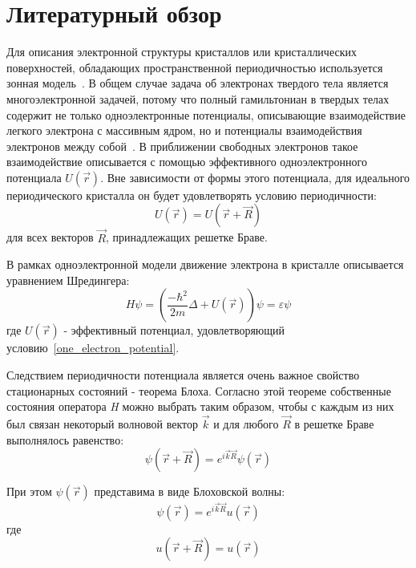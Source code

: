 \chapter{Литературный обзор} \label{chapt1}


Для описания электронной структуры кристаллов или кристаллических 
поверхностей, обладающих пространственной периодичностью используется
зонная модель~\cite{Kittel1976}. В общем случае задача об электронах 
твердого тела является многоэлектронной задачей, потому что полный 
гамильтониан в твердых телах содержит не только одноэлектронные 
потенциалы, описывающие взаимодействие легкого электрона с массивным 
ядром, но и потенциалы взаимодействия электронов между собой~\cite{Simonov_disser}.
В приближении свободных электронов такое взаимодействие описывается
с помощью эффективного одноэлектронного потенциала $U(\vec{r})$. 
Вне зависимости от формы этого потенциала, для идеального периодического
кристалла он будет удовлетворять условию периодичности:
\begin{equation}
	\label{one_electron_potential}
	U(\vec{r})=U(\vec{r}+\vec{R})
\end{equation}
для всех векторов $\vec{R}$, принадлежащих решетке Браве.


В рамках одноэлектронной модели движение электрона в кристалле описывается
уравнением Шредингера:
\begin{equation}
	\label{Shredinger_equation}
	H\psi=\left(\frac{-\hbar^2}{2m}\Delta+U(\vec{r})\right)\psi=\varepsilon\psi
\end{equation}
где $U(\vec{r})$ - эффективный потенциал, удовлетворяющий условию~\ref{one_electron_potential}.


Следствием периодичности потенциала является очень важное свойство 
стационарных состояний - теорема Блоха. Согласно этой теореме 
собственные состояния оператора \textit{H} можно выбрать таким образом,
чтобы с каждым из них был связан некоторый волновой вектор $\vec{k}$ и 
для любого $\vec{R}$ в решетке Браве выполнялось равенство:
\begin{equation}
	\label{equaliation_of_wave_func}
	\psi(\vec{r}+\vec{R})=e^{i\vec{k}\vec{R}}\psi(\vec{r})
\end{equation}


При этом $\psi(\vec{r})$ представима в виде Блоховской волны:
\begin{equation}
	\label{Bloh_wave}
	\psi(\vec{r})=e^{i\vec{k}\vec{R}}u(\vec{r})
\end{equation}
где
\begin{equation}
	\label{u_wave}
	u(\vec{r}+\vec{R})=u(\vec{r})
\end{equation}


